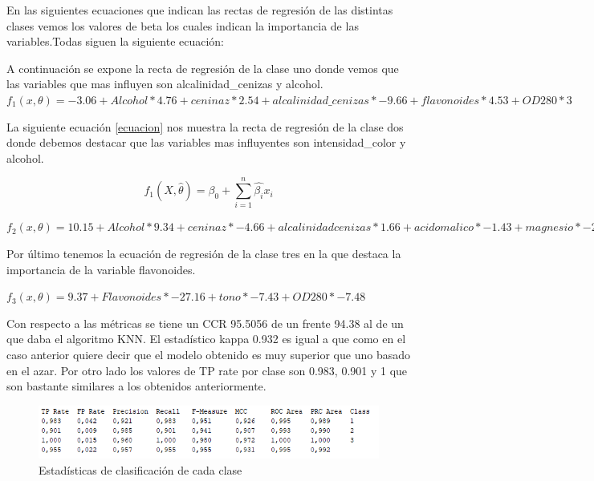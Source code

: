 En las siguientes ecuaciones que indican las rectas de regresión de las distintas clases vemos los valores de beta los cuales indican la importancia de las variables.Todas siguen la siguiente ecuación:

A continuación se expone la recta de regresión de la clase uno donde vemos que las variables que mas influyen son alcalinidad\_cenizas y alcohol. $f_1(x,\theta)=-3.06+Alcohol\ast4.76+ceninaz\ast2.54+alcalinidad\_cenizas\ast-9.66+flavonoides\ast4.53+OD280\ast3$

La siguiente ecuación \ref{ecuacion} nos muestra la recta de regresión de la clase dos donde debemos destacar que las variables mas influyentes son intensidad\_color y alcohol.

\begin{equation}
	f_1(X,\hat{\theta}) = \beta_0 + \sum_{i=1}^{n} \hat{\beta_i}x_i
	\label{ecuacion}
\end{equation}


$ f_2(x,\theta)=10.15+Alcohol\ast9.34+ceninaz\ast-4.66+alcalinidadcenizas\ast1.66+acidomalico\ast-1.43+magnesio\ast-2.29+intensidadcolor\ast-7.23 $


Por último tenemos la ecuación de regresión de la clase tres en la que destaca la importancia de la variable flavonoides.

$ f_3(x,\theta)=9.37+Flavonoides\ast-27.16+tono\ast-7.43+OD280\ast-7.48 $

Con respecto a las métricas se tiene un CCR 95.5056 de un  frente 94.38 al de un que daba el algoritmo KNN. El estadístico kappa 0.932 es igual a que como en el caso anterior quiere decir que el modelo obtenido es muy superior que uno basado en el azar. Por otro lado los valores de TP rate por clase son 0.983, 0.901 y 1 que son bastante similares a los obtenidos anteriormente. 

\begin{figure}[H]
    \centering
    \includegraphics[width=\textwidth]{img/SLbyClass.PNG}
    \caption{Estadísticas de clasificación de cada clase}
    
\end{figure}